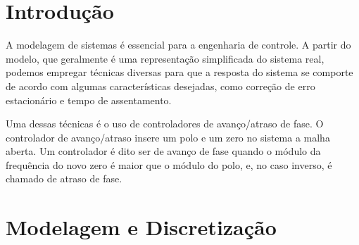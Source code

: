 \documentclass{article}
\begin{document}

\section{Introdução}
{
    A modelagem de sistemas é essencial para a engenharia de controle. A partir do modelo, que geralmente é uma representação simplificada do sistema real, podemos empregar técnicas diversas para que a resposta do sistema se comporte de acordo com algumas características desejadas, como correção de erro estacionário e tempo de assentamento.
    
    Uma dessas técnicas é o uso de controladores de avanço/atraso de fase. O controlador de avanço/atraso insere um polo e um zero no sistema a malha aberta. Um controlador é dito ser de avanço de fase quando o módulo da frequência do novo zero é maior que o módulo do polo, e, no caso inverso, é chamado de atraso de fase.
}


\section{Modelagem e Discretização}
\end{document}

